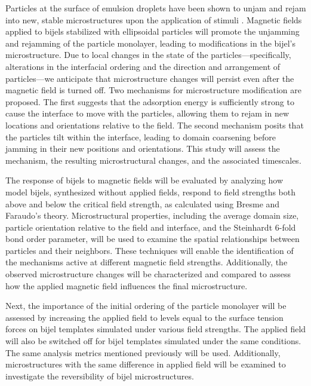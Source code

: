 Particles at the surface of emulsion droplets have been shown to unjam and rejam into new, stable microstructures upon the application of stimuli 
\cite{cui_stabilizing_2013}. Magnetic fields applied to bijels stabilized with ellipsoidal particles will promote the unjamming and rejamming of the 
particle monolayer, leading to modifications in the bijel's microstructure. Due to local changes in the state of the particles—specifically, alterations 
in the interfacial ordering and the direction and arrangement of particles—we anticipate that microstructure changes will persist even after the magnetic 
field is turned off. Two mechanisms for microstructure modification are proposed. The first suggests that the adsorption energy is sufficiently strong to 
cause the interface to move with the particles, allowing them to rejam in new locations and orientations relative to the field. The second mechanism posits 
that the particles tilt within the interface, leading to domain coarsening before jamming in their new positions and orientations. This study will assess the 
mechanism, the resulting microstructural changes, and the associated timescales.

The response of bijels to magnetic fields will be evaluated by analyzing how model bijels, synthesized without applied fields, respond to field 
strengths both above and below the critical field strength, as calculated using Bresme and Faraudo's theory. Microstructural properties, including the 
average domain size, particle orientation relative to the field and interface, and the Steinhardt 6-fold bond order parameter, will be used to examine 
the spatial relationships between particles and their neighbors. These techniques will enable the identification of the mechanisms active at different 
magnetic field strengths. Additionally, the observed microstructure changes will be characterized and compared to assess how the applied magnetic field 
influences the final microstructure.

Next, the importance of the initial ordering of the particle monolayer will be assessed by increasing the applied field to levels equal to the surface 
tension forces on bijel templates simulated under various field strengths. The applied field will also be switched off for bijel templates simulated under 
the same conditions. The same analysis metrics mentioned previously will be used. Additionally, microstructures with the same difference in applied field 
will be examined to investigate the reversibility of bijel microstructures.

